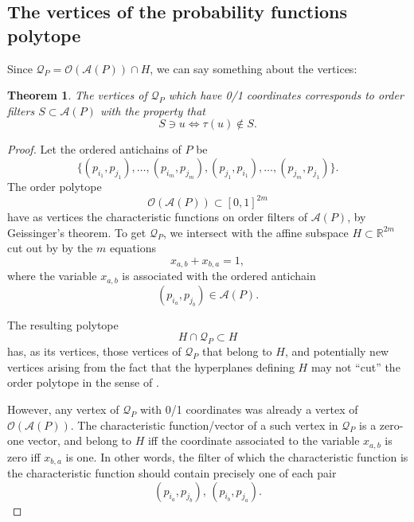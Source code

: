 \documentclass[11pt,a4paper,abstract=yes]{scrartcl}
\theoremstyle{plain}
\newtheorem{theorem}{Theorem}[section]
\newcommand{\RR}{\mathbb{R}}
\newcommand{\prpolytope}[1]{\mathcal{Q}_{#1}}
\newcommand{\orderpolytope}[1]{\mathcal{O}({#1})}
\newcommand{\twoanti}[1]{\mathcal{A}({#1})}
\begin{document}
\subsection{The vertices of the probability functions polytope}
\label{sec:org7e0e5be}
Since \(\prpolytope{P} = \orderpolytope{\twoanti{P}} \cap H\), we can say something about the vertices:
\begin{theorem}
The vertices of \(\prpolytope{P}\) which have 0/1 coordinates corresponds to order filters \(S \subset \twoanti{P}\) with the property
that
\[S \ni u \iff \tau(u) \not \in S.\]
\end{theorem}
\begin{proof}
Let the ordered antichains of \(P\) be
\[
\{(p_{i_{1}}, p_{j_{1}}), \dots, (p_{i_{m}}, p_{j_{m}}), (p_{j_{1}}, p_{i_{1}}), \dots, (p_{j_{m}}, p_{j_{1}}) \}.
\]
The order polytope
\[\orderpolytope{\twoanti{P}} \subset [0,1]^{2m}\] have as vertices the characteristic functions on
order filters of \(\twoanti{P}\), by Geissinger's theorem. To get \(\prpolytope{P}\),
we intersect with the affine subspace \(H \subset \RR^{2m}\) cut out by by the \(m\) equations
\[x_{a,b} + x_{b,a} = 1,\]
where the variable \(x_{a,b}\) is associated with the ordered antichain
\[(p_{i_{a}},p_{j_{b}}) \in \twoanti{P}.\]

The resulting polytope \[H \cap \prpolytope{P} \subset H\] has, as its vertices,  those vertices of
\(\prpolytope{P}\) that belong to \(H\), and potentially new vertices arising from
the fact that the hyperplanes defining \(H\) may not ``cut'' the order polytope
in the sense of \autocite{HibiCutting}.

However, any vertex of \(\prpolytope{P}\) with 0/1 coordinates was already a vertex of
\(\orderpolytope{\twoanti{P}}\). The characteristic function/vector of a such vertex in
\(\prpolytope{P}\) is a zero-one vector, and belong to \(H\) iff the coordinate associated to
the variable \(x_{a,b}\) is zero iff \(x_{b,a}\) is one. In other words,
the filter of which the characteristic function is the characteristic function should contain
precisely one of each pair
\[
(p_{i_{a}},p_{j_{b}}), \, (p_{i_{b}},p_{j_{a}}).
\]
\end{proof}
\end{document}
